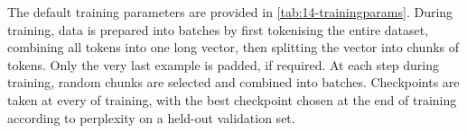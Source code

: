 The default training parameters are provided in \cref{tab:14-trainingparams}. During training, data is prepared into batches by first tokenising the entire dataset, combining all tokens into one long vector, then splitting the vector into chunks of  tokens. Only the very last example is padded, if required. At each step during training, random chunks are selected and combined into batches. Checkpoints are taken at every  of training, with the best checkpoint chosen at the end of training according to perplexity on a held-out validation set.%


